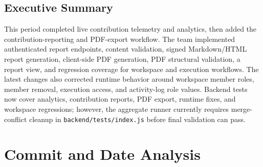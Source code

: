 \documentclass[11pt,a4paper]{article}
\begin{document}
\subsection{Executive Summary}

This period completed live contribution telemetry and analytics, then added the contribution-reporting and PDF-export workflow. The team implemented authenticated report endpoints, content validation, signed Markdown/HTML report generation, client-side PDF generation, PDF structural validation, a report view, and regression coverage for workspace and execution workflows. The latest changes also corrected runtime behavior around workspace member roles, member removal, execution access, and activity-log role values. Backend tests now cover analytics, contribution reports, PDF export, runtime fixes, and workspace regressions; however, the aggregate runner currently requires merge-conflict cleanup in \texttt{backend/tests/index.js} before final validation can pass.

\section{Commit and Date Analysis}
\end{document}

